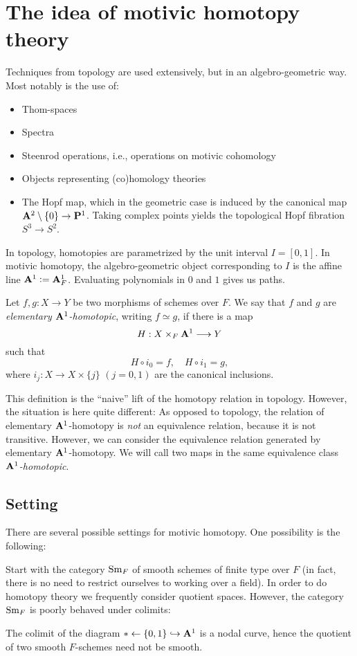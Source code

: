 \section{The idea of motivic homotopy theory}
Techniques from topology are used extensively, but in an algebro-geometric way. Most notably is the use of:
\begin{itemize}
\item Thom-spaces
\item Spectra
\item Steenrod operations, i.e., operations on motivic cohomology
\item Objects representing (co)homology theories
\item The Hopf map, which in the geometric case is induced by the canonical map $\mathbf{A}^2\setminus\{0\}\to\mathbf{P}^1$. Taking complex points yields the topological Hopf fibration $S^3\to S^2$.
\end{itemize}

In topology, homotopies are parametrized by the unit interval $I=[0,1]$. In motivic homotopy, the algebro-geometric object corresponding to $I$ is the affine line $\mathbf{A}^1\vcentcolon=\mathbf{A}^1_F$. Evaluating polynomials in $0$ and $1$ gives us paths. 

\begin{definition}
Let $f,g:X\to Y$ be two morphisms of schemes over $F$. We say that $f$ and $g$ are \emph{elementary $\mathbf{A}^1$-homotopic}, writing $f\simeq g$, if there is a map
\[H:X\times_F\mathbf{A}^1\longrightarrow Y\]
such that
\[H\circ i_0=f,\quad H\circ i_1=g,\]
where $i_j:X\to X\times\{j\}$ $(j=0,1)$ are the canonical inclusions.
\end{definition}
This definition is the ``naive'' lift of the homotopy relation in topology. However, the situation is here quite different: As opposed to topology, the relation of elementary $\mathbf{A}^1$-homotopy is \emph{not} an equivalence relation, because it is not transitive. However, we can consider the equivalence relation generated by elementary $\mathbf{A}^1$-homotopy. We will call two maps in the same equivalence class \emph{$\mathbf{A}^1$-homotopic}.

\subsection{Setting}There are several possible settings for motivic homotopy. One possibility is the following:

Start with the category $\mathrm{Sm}_F$ of smooth schemes of finite type over $F$ (in fact, there is no need to restrict ourselves to working over a field). In order to do homotopy theory we frequently consider quotient spaces. However, the category $\mathrm{Sm}_F$ is poorly behaved under colimits:
\begin{example}
The colimit of the diagram $*\leftarrow\{0,1\}\hookrightarrow\mathbf{A}^1$ is a nodal curve, hence the quotient of two smooth $F$-schemes need not be smooth.
\end{example}

